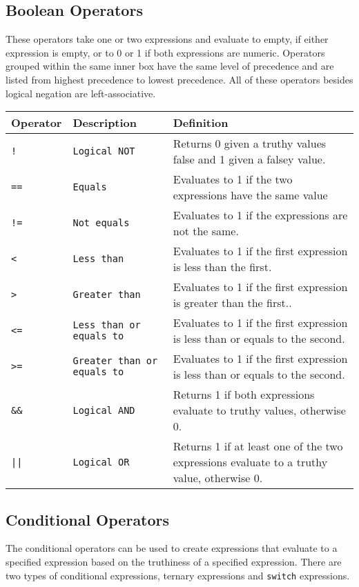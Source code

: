 		\subsection{Boolean Operators}
			These operators take one or two expressions and evaluate to empty, if either expression is empty, or to 0 or 1 if both expressions are numeric. Operators grouped within the same inner box have the same level of precedence and are listed from highest precedence to lowest precedence. All of these operators besides logical negation are left-associative.
			\begin{table}[H]
			\begin{tabular}{ |p{2cm}|p{5cm}|p{7cm}|  }
			\hline
			\textbf{Operator} & \textbf{Description} & \textbf{Definition} \\ \hline
			\texttt{!} & \texttt{Logical NOT} & {Returns 0 given a truthy values false and 1 given a falsey value.} \\ \hline
			\texttt{==} & \texttt{Equals} & {Evaluates to 1 if the two expressions have the same value} \\
			\texttt{!=} & \texttt{Not equals} & {Evaluates to 1 if the expressions are not the same.} \\
			\texttt{<} & \texttt{Less than} & {Evaluates to 1 if the first expression is less than the first.} \\
			\texttt{>} & \texttt{Greater than} & {Evaluates to 1 if the first expression is greater than the first.}. \\
			\texttt{<=} & \texttt{Less than or equals to} & {Evaluates to 1 if the first expression is less than or equals to the second.} \\
			\texttt{>=} & \texttt{Greater than or equals to} & {Evaluates to 1 if the first expression is less than or equals to the second.} \\ \hline
			\texttt{\&\&} & \texttt{Logical AND} & {Returns 1 if both expressions evaluate to truthy values, otherwise 0.} \\ \hline
			\texttt{||} & \texttt{Logical OR} & {Returns 1 if at least one of the two expressions evaluate to a truthy value, otherwise 0.} \\ \hline
			\end{tabular}
			\end{table}
		\subsection{Conditional Operators}
			The conditional operators can be used to create expressions that evaluate to a specified expression based on the truthiness of a specified expression. There are two types of conditional expressions, ternary expressions and \texttt{switch} expressions.
			
